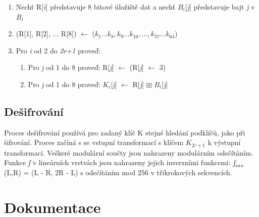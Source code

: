 \documentclass[12pt,a4paper]{article}
\let\oldsection\section
\renewcommand\section{\clearpage\oldsection}
\begin{document}
\begin{enumerate}
\item Nechť R[\emph{i}] představuje 8 bitové úložiště dat a nechť $B_{i}$[\emph{j}] představuje bajt \emph{j} v $B_{i}$
\item (R[1], R[2], ... R[8]) $\leftarrow$ ($k_{1}...k_{8},k_{9}...k_{16},...,k_{57}...k_{64}$)
\item Pro \emph{i} od 2 do \emph{2r+1} proveď: 
\begin{enumerate}
\item Pro \emph{j} od 1 do 8 proveď: R[\emph{j}] $\leftarrow$ (R[\emph{j}] $\leftarrow$ 3)
\item Pro \emph{j} od 1 do 8 proveď: $K_{i}$[\emph{j}] $\leftarrow$ R[\emph{j}] $\boxplus$ $B_{i}$[\emph{j}]
\end{enumerate}
\end{enumerate}

\subsection{Dešifrování}
Proces dešifrování používá pro zadaný klíč K stejné hledání podklíčů, jako při šifrování. Proces začíná s se vstupní transformací s klíčem $K_{2r+1}$ k výstupní transformaci. Veškeré modulární součty jsou nahrazeny modulárním odečítáním.
Funkce \emph{f} v lineárních vrstvách jsou nahrazeny jejich inverzními funkcemi: $\emph{f}_{inv}$(L,R) = (L - R, 2R - L) s odečítáním mod 256 v tříkrokových sekvencích.



{\section{Dokumentace}}
\end{document}
